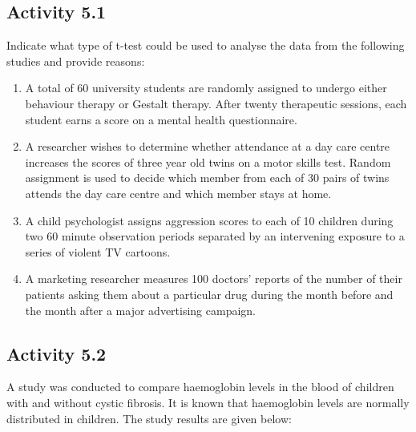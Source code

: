 \documentclass[
]{memoir}
\providecommand{\tightlist}{%
  \setlength{\itemsep}{0pt}\setlength{\parskip}{0pt}}
\begin{document}
\hypertarget{activity-5.1}{%
\subsection*{Activity 5.1}\label{activity-5.1}}

Indicate what type of t-test could be used to analyse the data from the following studies and provide reasons:

\begin{enumerate}
\def\labelenumi{\alph{enumi})}
\tightlist
\item
  A total of 60 university students are randomly assigned to undergo either behaviour therapy or Gestalt therapy. After twenty therapeutic sessions, each student earns a score on a mental health questionnaire.
\item
  A researcher wishes to determine whether attendance at a day care centre increases the scores of three year old twins on a motor skills test. Random assignment is used to decide which member from each of 30 pairs of twins attends the day care centre and which member stays at home.
\item
  A child psychologist assigns aggression scores to each of 10 children during two 60 minute observation periods separated by an intervening exposure to a series of violent TV cartoons.
\item
  A marketing researcher measures 100 doctors' reports of the number of their patients asking them about a particular drug during the month before and the month after a major advertising campaign.
\end{enumerate}

\hypertarget{activity-5.2}{%
\subsection*{Activity 5.2}\label{activity-5.2}}

A study was conducted to compare haemoglobin levels in the blood of children with and without cystic fibrosis. It is known that haemoglobin levels are normally distributed in children. The study results are given below:

 
  \providecommand{\huxb}[2]{\arrayrulecolor[RGB]{#1}\global\arrayrulewidth=#2pt}
  \providecommand{\huxvb}[2]{\color[RGB]{#1}\vrule width #2pt}
  \providecommand{\huxtpad}[1]{\rule{0pt}{#1}}
  \providecommand{\huxbpad}[1]{\rule[-#1]{0pt}{#1}}
\end{document}
